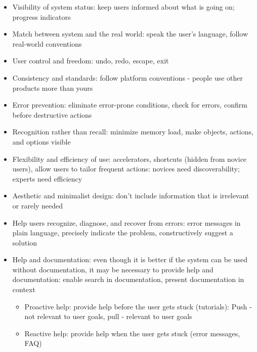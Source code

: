 \documentclass[10pt,letterpaper,unboxed,cm]{article}
\begin{document}
\begin{itemize}
    \item Visibility of system status: keep users informed about what is going on; progress indicators
    \item Match between system and the real world: speak the user's language, follow real-world conventions
    \item User control and freedom: undo, redo, escape, exit
    \item Consistency and standards: follow platform conventions - people use other products more than yours
    \item Error prevention: eliminate error-prone conditions, check for errors, confirm before destructive actions
    \item Recognition rather than recall: minimize memory load, make objects, actions, and options visible
    \item Flexibility and efficiency of use: accelerators, shortcuts (hidden from novice users), allow users to tailor frequent actions: 
    novices need discoverability; experts need efficiency
    \item Aesthetic and minimalist design: don't include information that is irrelevant or rarely needed
    \item Help users recognize, diagnose, and recover from errors: error messages in plain language, precisely indicate the problem, constructively suggest a solution
    \item Help and documentation: even though it is better if the system can be used without documentation, it may be necessary to provide help and documentation:
    enable search in documentation, present documentation in context
    \begin{itemize}
        \item Proactive help: provide help before the user gets stuck (tutorials): Push - not relevant to user goals, pull - relevant to user goals
        \item Reactive help: provide help when the user gets stuck (error messages, FAQ)
    \end{itemize}
\end{itemize}
\end{document}

